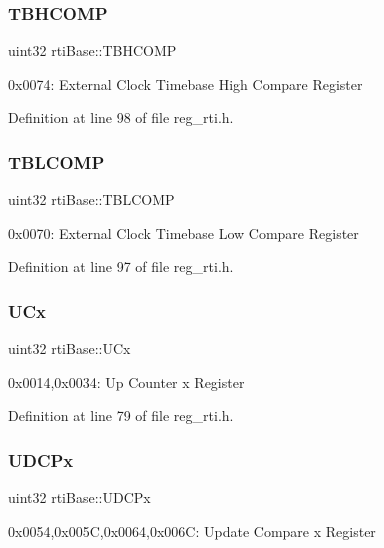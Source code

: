 \subsubsection{\texorpdfstring{T\+B\+H\+C\+O\+MP}{TBHCOMP}}
{\footnotesize\ttfamily uint32 rti\+Base\+::\+T\+B\+H\+C\+O\+MP}

0x0074\+: External Clock Timebase High Compare Register 

Definition at line 98 of file reg\+\_\+rti.\+h.

\mbox{\label{structrtiBase_a6cc863a971efafbc66b1d79d0b127e48}} 
\subsubsection{\texorpdfstring{T\+B\+L\+C\+O\+MP}{TBLCOMP}}
{\footnotesize\ttfamily uint32 rti\+Base\+::\+T\+B\+L\+C\+O\+MP}

0x0070\+: External Clock Timebase Low Compare Register 

Definition at line 97 of file reg\+\_\+rti.\+h.

\mbox{\label{structrtiBase_adf5b74098e372deddc64f9ffdf106512}} 
\subsubsection{\texorpdfstring{U\+Cx}{UCx}}
{\footnotesize\ttfamily uint32 rti\+Base\+::\+U\+Cx}

0x0014,0x0034\+: Up Counter x Register 

Definition at line 79 of file reg\+\_\+rti.\+h.

\mbox{\label{structrtiBase_a2ae8480f257fe5df22d61fd8edca1fb0}} 
\subsubsection{\texorpdfstring{U\+D\+C\+Px}{UDCPx}}
{\footnotesize\ttfamily uint32 rti\+Base\+::\+U\+D\+C\+Px}

0x0054,0x005C,0x0064,0x006C\+: Update Compare x Register 

